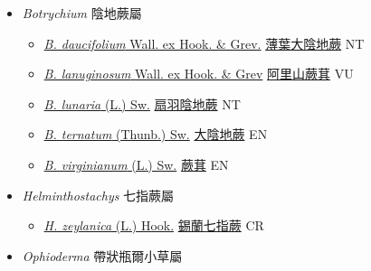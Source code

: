
  \begin{itemize}
 \item[] \textit{Botrychium} 陰地蕨屬
                    
  \begin{itemize}
        \item[] \href{http://www.theplantlist.org/tpl1.1/search?q=Botrychium+daucifolium}{\textit{B. daucifolium} Wall. ex Hook. \& Grev.}   \href{\detokenize{http://taibnet.sinica.edu.tw/chi/taibnet_species_list.php?T2=薄葉大陰地蕨&T2_new_value=true&fr=y}}{薄葉大陰地蕨} NT
        \item[] \href{http://www.theplantlist.org/tpl1.1/search?q=Botrychium+lanuginosum}{\textit{B. lanuginosum} Wall. ex Hook. \& Grev}   \href{\detokenize{http://taibnet.sinica.edu.tw/chi/taibnet_species_list.php?T2=阿里山蕨萁&T2_new_value=true&fr=y}}{阿里山蕨萁} VU
        \item[] \href{http://www.theplantlist.org/tpl1.1/search?q=Botrychium+lunaria}{\textit{B. lunaria} (L.) Sw.}   \href{\detokenize{http://taibnet.sinica.edu.tw/chi/taibnet_species_list.php?T2=扇羽陰地蕨&T2_new_value=true&fr=y}}{扇羽陰地蕨} NT
        \item[] \href{http://www.theplantlist.org/tpl1.1/search?q=Botrychium+ternatum}{\textit{B. ternatum} (Thunb.) Sw.}   \href{\detokenize{http://taibnet.sinica.edu.tw/chi/taibnet_species_list.php?T2=大陰地蕨&T2_new_value=true&fr=y}}{大陰地蕨} EN
        \item[] \href{http://www.theplantlist.org/tpl1.1/search?q=Botrychium+virginianum}{\textit{B. virginianum} (L.) Sw.}   \href{\detokenize{http://taibnet.sinica.edu.tw/chi/taibnet_species_list.php?T2=蕨萁&T2_new_value=true&fr=y}}{蕨萁} EN
  \end{itemize}
 \item[] \textit{Helminthostachys} 七指蕨屬
                    
  \begin{itemize}
        \item[] \href{http://www.theplantlist.org/tpl1.1/search?q=Helminthostachys+zeylanica}{\textit{H. zeylanica} (L.) Hook.}   \href{\detokenize{http://taibnet.sinica.edu.tw/chi/taibnet_species_list.php?T2=錫蘭七指蕨&T2_new_value=true&fr=y}}{錫蘭七指蕨} CR
  \end{itemize}
 \item[] \textit{Ophioderma} 帶狀瓶爾小草屬
                    

\end{itemize}
